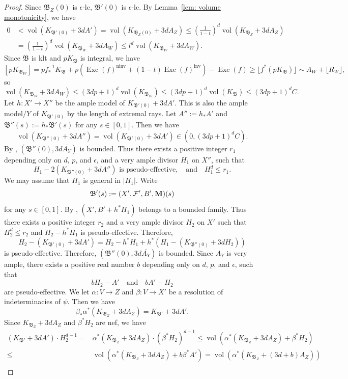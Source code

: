 \documentclass[11pt,reqno]{amsart}
\numberwithin{equation}{section}
\newcommand{\Mm}{{\bf{M}}}
\newcommand{\vol}{\operatorname{vol}}
\newcommand{\Exc}{\operatorname{Exc}}
\newcommand{\ninv}{\operatorname{ninv}}
\newcommand{\inv}{\operatorname{inv}}
\newcommand{\Bb}{{\mathfrak{B}}}
\newcommand{\Ff}{\mathcal{F}}
\theoremstyle{definition}
\begin{document}
\begin{proof}
Since $\Bb_Z(0)$ is $\epsilon$-lc, $\Bb'(0)$ is $\epsilon$-lc. By Lemma~\ref{lem: volume monotonicity}, we have
\begin{align*}
    0&<\vol(K_{\Bb'(0)}+3dA')=\vol(K_{\Bb_Z(0)}+3dA_Z)\leq\left(\frac{1}{1-t}\right)^d\vol(K_{\Bb_Z}+3dA_Z)\\
    &=\left(\frac{1}{1-t}\right)^d\vol(K_{\Bb_W}+3dA_W)\leq l^d\vol(K_{\Bb_W}+3dA_W).
\end{align*}
Since $\Bb$ is klt and $pK_{\Bb}$ is integral, we have
$$\left\lfloor pK_{\Bb_W}\right\rfloor=pf^{-1}_*K_{\Bb}+p(\Exc(f)^{\ninv}+(1-t)\Exc(f)^{\inv})-\Exc(f)\geq \lfloor f^*(pK_{\Bb})\rfloor\sim A_W+\lfloor R_W\rfloor,$$
so 
$$\vol(K_{\Bb_W}+3dA_W)\leq (3dp+1)^d\vol(K_{\Bb_W})\leq (3dp+1)^d\vol(K_{\Bb})\leq (3dp+1)^dC.$$
Let $h\colon X'\rightarrow X''$ be the ample model of $K_{\Bb'(0)}+3dA'$. This is also the ample model$/Y$ of $K_{\Bb'(0)}$ by the length of extremal rays. Let $A'':=h_*A'$ and $\Bb''(s):=h_*\Bb'(s)$ for any $s\in [0,1]$. Then we have
$$\vol(K_{\Bb''(0)}+3dA'')=\vol(K_{\Bb'(0)}+3dA')\in\left(0,(3dp+1)^dC\right).$$
By \cite[Lemma~6.6]{BH22}, $(\Bb''(0),3d\overline{A_Y})$ is bounded. Thus there exists a positive integer $r_1$ depending only on $d$, $p$, and $\epsilon$, and a very ample divisor $H_1$ on $X''$, such that
$$H_1-2(K_{\Bb''(0)}+3dA'') \text{ is pseudo-effective}, \quad \text{and}\quad H_1^d\leq r_1.$$ We may assume that $H_1$ is general in $|H_1|$. Write
$$\Bb'(s):=(X',\Ff',B',\Mm)(s)$$
for any $s\in [0,1]$. By \cite[Theorem~2.3]{Bir24}, $(X',B'+h^*H_1)$ belongs to a bounded family. Thus there exists a positive integer $r_2$ and a very ample divisor $H_2$ on $X'$ such that $H_2^d\leq r_2$ and $H_2-h^*H_1$ is pseudo-effective. Therefore,
$$H_2-(K_{\Bb'(0)}+3dA')=H_2-h^*H_1+h^*(H_1-(K_{\Bb''(0)}+3dH_2))$$
is pseudo-effective. Therefore, $(\Bb''(0),3d\overline{A_Y})$ is bounded. Since $A_Y$ is very ample, there exists a positive real number $b$ depending only on $d$, $p$, and $\epsilon$, such that
$$bH_2-A'\quad \text{and}\quad bA'-H_2$$
are pseudo-effective. We let $\alpha: V\rightarrow Z$ and $\beta: V\rightarrow X'$ be a resolution of indeterminacies of $\psi$. Then we have
$$\beta_*\alpha^*(K_{\Bb_Z}+3dA_Z)=K_{\Bb'}+3dA'.$$
Since $K_{\Bb_Z}+3dA_Z$ and $\beta^*H_2$ are nef, we have
\begin{align*}
    (K_{\Bb'}+3dA')\cdot H_2^{d-1}=&\alpha^*(K_{\Bb_{Z}}+3dA_Z)\cdot(\beta^*H_2)^{d-1}\leq\vol(\alpha^*(K_{\Bb_{Z}}+3dA_Z)+\beta^*H_2)\\
    \leq&\vol(\alpha^*(K_{\Bb_{Z}}+3dA_Z)+b\beta^*A')=\vol(\alpha^*(K_{\Bb_{Z}}+(3d+b)A_Z))\\

\end{align*}
\end{proof}
\end{document}
